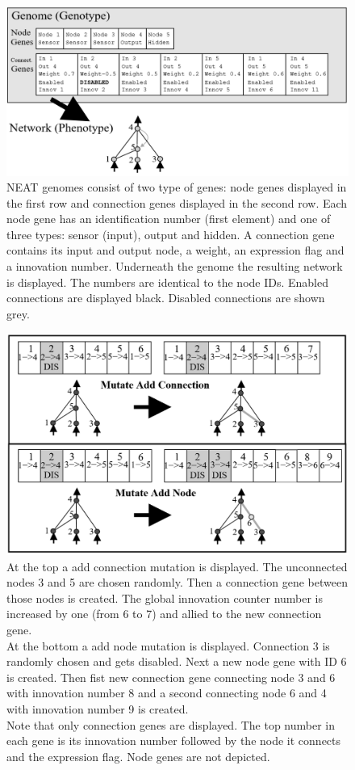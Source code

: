   
\begin{figure}[tb]
	\centering
	\includegraphics[width=0.7\linewidth]{figures/NEAT/NEATGenome}
	\caption[NEAT genome]{NEAT genomes consist of two type of genes: node genes displayed in the first row and connection genes displayed in the second row. Each node gene has an identification number (first element) and one of three types: sensor (input), output and hidden. A connection gene contains its input and output node, a weight, an expression flag and a innovation number. Underneath the genome the resulting network is displayed. The numbers are identical to the node IDs. Enabled connections are displayed black. Disabled connections are shown grey. \cite[p. 106]{NEAT} }
	\label{fig:neatgenome} %
\end{figure}
  
  
  
\begin{figure}[tb]
	\centering
	\includegraphics[width=0.7\linewidth]{figures/NEAT/NEATMutations}
	\caption[NEAT mutations]{At the top a add connection mutation is displayed. The unconnected nodes 3 and 5 are chosen randomly. Then a connection gene between  those nodes is created. The global innovation counter number is increased by one (from 6 to 7) and allied to the new connection gene.\\
	At the bottom a add node mutation is displayed. Connection 3 is randomly chosen and gets disabled. Next a new node gene with ID 6 is created. Then fist new connection gene connecting  node 3 and 6 with innovation number 8 and a second connecting node 6 and 4 with innovation number 9 is created. \\
Note that only connection genes are displayed. The top number in each gene is its innovation number followed by the node it connects and the expression flag.
Node genes are not depicted.
\cite[p. 107]{NEAT}}
	\label{fig:neatmutations}
\end{figure}
  
